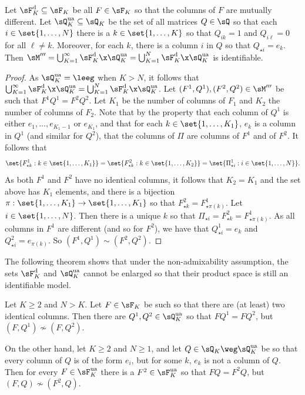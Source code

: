 \documentclass[12pt,a4paper]{article}
\begin{document}
\begin{theorem}
    Let $\sF_K^{\text{d}}\subseteq \sF_K$ be all $F\in\sF_K$ so that the columns of $F$ are mutually different. Let $\sQ^{\text{ua}}_K\subseteq \sQ_K$ be the set of all matrices $Q\in\sQ$ so that each $i\in\set{1,\ldots,N}$ there is a $k\in\set{1,\ldots,K}$ so that $Q_{ik}=1$ and $Q_{i\ell}=0$ for all $\ell\neq k$. Moreover, for each $k$, there is a column $i$ in $Q$ so that $Q_{\star i}=e_k$. Then $\sM'''=\bigcup_{K=1}^\infty \sF_K^{\text d}\x \sQ_K^{\text{ua}}=\bigcup_{K=1}^N \sF_K^{\text d}\x \sQ_K^{\text{ua}}$ is identifiable.
\end{theorem}
\begin{proof}
As $\sQ_K^{\text{ua}}=\leeg$ when $K>N$, it follows that $\bigcup_{K=1}^\infty \sF_K^{\text d}\x \sQ_K^{\text{ua}}=\bigcup_{K=1}^N \sF_K^{\text d}\x \sQ_K^{\text{ua}}$.
Let $(F^1,Q^1),(F^2,Q^2)\in\sM'''$ be such that $F^1Q^1=F^2Q^2$. Let $K_1$ be the number of columns of $F_1$ and $K_2$ the number of columns of $F_2$. Note that by the property that each column of $Q^1$ is either $e_1,\ldots,e_{K_1-1}$ or $e_{K_1}$, and that for each $k\in\set{1,\ldots,K_1}$, $e_{k}$ is a column in $Q^1$ (and similar for $Q^2$), that the columns of $\Pi$ are columns of $F^1$ and of $F^2$. It follows that \[
    \set{F_{\star k}^1:k\in\set{1,\ldots,K_1}}= \set{F_{\star k}^2:k\in\set{1,\ldots,K_2}}= \set{\Pi_{\star i}^1:i\in\set{1,\ldots,N}}.  
    \]
    As both $F^1$ and $F^2$ have no identical columns, it follows that $K_2=K_1$ and the set above has $K_1$ elements, and there is a bijection $\pi:\set{1,\ldots,K_1}\to\set{1,\ldots,K_1}$ so that $F_{\star k}^2 = F_{\star \pi(k)}^1$. Let $i\in\set{1,\ldots,N}$. Then there is a unique $k$ so that $\Pi_{\star i}=F_{\star k}^2=F_{\star \pi(k)}^1$. As all columns in $F^1$ are different (and so for $F^2$), we have that $Q_{\star i}^1 = e_k$ and $Q_{\star i}^2=e_{\pi(k)}$. So $(F^1,Q^1)\sim (F^2,Q^2)$.  
\end{proof}
The following theorem shows that under the non-admixability assumption, the sets $\sF^{\text d}_K$ and $\sQ^{\text{ua}}_K$ cannot be enlarged so that their product space is still an identifiable model.
\begin{theorem}
  Let $K\ge 2$ and $N>K$.  Let $F\in\sF_K$ be such so that there are (at least) two identical columns.  Then there are $Q^1,Q^2\in\sQ_K^{\text{ua}}$ so that $FQ^1=FQ^2$, but $(F,Q^1)\not\sim (F,Q^2)$. 
  
  On the other hand, let $K\ge 2$ and $N\ge 1$, and let $Q\in\sQ_K\weg \sQ_K^{\text{ua}}$ be so that every column of $Q$ is of the form $e_i$, but for some $k$, $e_k$ is not a column of $Q$. Then for every $F\in\sF^{\text{ua}}_K$ there is a $F^2\in\sF^{\text{ua}}_K$ so that $FQ=F^2Q$, but $(F,Q)\not\sim (F^2,Q)$.
\end{theorem}
\end{document}
